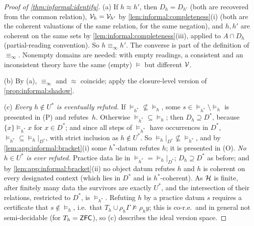 \begin{proof}[Proof of \cref{thm:informal:identify}]
(a) If $h\approx h'$, then $D_h=D_{h'}$ (both are recovered from the common relation), $\mathcal V_{h}=\mathcal V_{h'}$ by \cref{lem:informal:completeness}(i) (both are the coherent valuations of the same relation, for the same negation), and $h,h'$ are coherent on the same sets by \cref{lem:informal:completeness}(iii), applied to $A\cap D_h$ (partial-reading convention). So $h\equiv_\infty h'$. The converse is part of the definition of $\equiv_\infty$. Nonempty domains are needed: with empty readings, a consistent and an inconsistent theory have the same (empty) ${\models}$ but different $\mathcal V_{}$.

(b) By (a), $\equiv_\infty$ and $\approx$ coincide; apply the closure-level version of \cref{prop:informal:shadow}.

(c) \emph{Every $h\notin U^*$ is eventually refuted.} If ${\models_{h^*}}\not\subseteq{\models_h}$, some $s\in{\models_{h^*}}\setminus{\models_h}$ is presented in (P) and refutes~$h$. Otherwise ${\models_{h^*}}\subseteq{\models_h}$; then $D_h\supseteq D^*$, because $\{x\}\models_{h^*}x$ for $x\in D^*$; and since all steps of ${\models_{h^*}}$ have occurrences in $D^*$, ${\models_{h^*}}\subseteq{\models_h}|_{D^*}$, with strict inclusion as $h\notin U^*$. So ${\models_h}|_{D^*}\not\subseteq{\models_{h^*}}$, and by \cref{lem:app:informal:bracket}(i) some $h^*$-datum refutes $h$; it is presented in (O). \emph{No $h\in U^*$ is ever refuted.} Practice data lie in ${\models_{h^*}}={\models_h}|_{D^*}$; $D_h\supseteq D^*$ as before; and by \cref{lem:app:informal:bracket}(ii) no object datum refutes $h$ and $h$ is coherent on every designated context (which lies in $D^*$ and is $h^*$-coherent). As $\mathcal{H}$ is finite, after finitely many data the survivors are exactly $U^*$, and the intersection of their relations, restricted to $D^*$, is ${\models_{h^*}}$. Refuting $h$ by a practice datum $s$ requires a certificate that $s\notin{\models_h}$, i.e.\ that $T_h\cup\rho_h\Gamma\not\models\rho_hy$; this is co-r.e.\ and in general not semi-decidable (for $T_h=\mathsf{ZFC}$), so (c) describes the ideal version space.


\end{proof}
